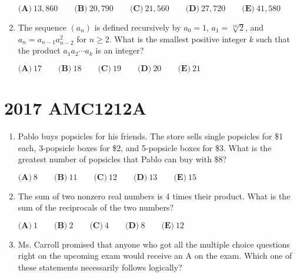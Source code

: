\documentclass{article}
\begin{document}
\begin{enumerate}[label=\arabic*., itemsep=0.5em]
$\textbf{(A)}\ 13,860\qquad\textbf{(B)}\ 20,790\qquad\textbf{(C)}\ 21,560 \qquad\textbf{(D)}\ 27,720 \qquad\textbf{(E)}\ 41,580$\par \vspace{0.5em}\item The sequence $(a_n)$ is defined recursively by $a_0=1$, $a_1=\sqrt[19]{2}$, and $a_n=a_{n-1}a_{n-2}^2$ for $n\geq 2$. What is the smallest positive integer $k$ such that the product $a_1a_2\cdots a_k$ is an integer?

$\textbf{(A)}\ 17\qquad\textbf{(B)}\ 18\qquad\textbf{(C)}\ 19\qquad\textbf{(D)}\ 20\qquad\textbf{(E)}\ 21$\par \vspace{0.5em}\end{enumerate}\newpage\section*{2017 AMC1212A}\begin{enumerate}[label=\arabic*., itemsep=0.5em]\item Pablo buys popsicles for his friends. The store sells single popsicles for \$1 each, 3-popsicle boxes for \$2, and 5-popsicle boxes for \$3. What is the greatest number of popsicles that Pablo can buy with \$8?

$\textbf{(A)}\ 8\qquad\textbf{(B)}\ 11\qquad\textbf{(C)}\ 12\qquad\textbf{(D)}\ 13\qquad\textbf{(E)}\ 15$\par \vspace{0.5em}\item The sum of two nonzero real numbers is 4 times their product. What is the sum of the reciprocals of the two numbers?

$\textbf{(A)}\ 1\qquad\textbf{(B)}\ 2\qquad\textbf{(C)}\ 4\qquad\textbf{(D)}\ 8\qquad\textbf{(E)}\ 12$\par \vspace{0.5em}\item Ms. Carroll promised that anyone who got all the multiple choice questions right on the upcoming exam would receive an A on the exam. Which one of these statements necessarily follows logically?


\end{enumerate}
\end{document}
